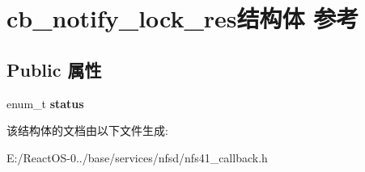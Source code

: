 \hypertarget{structcb__notify__lock__res}{}\section{cb\+\_\+notify\+\_\+lock\+\_\+res结构体 参考}
\label{structcb__notify__lock__res}
\subsection*{Public 属性}
\begin{DoxyCompactItemize}
\item 
\mbox{\label{structcb__notify__lock__res_ad55f5dfc8eda55da1de20a5e5f80bead}} 
enum\+\_\+t {\bfseries status}
\end{DoxyCompactItemize}


该结构体的文档由以下文件生成\+:\begin{DoxyCompactItemize}
\item 
E\+:/\+React\+O\+S-\/0../base/services/nfsd/nfs41\+\_\+callback.\+h\end{DoxyCompactItemize}
